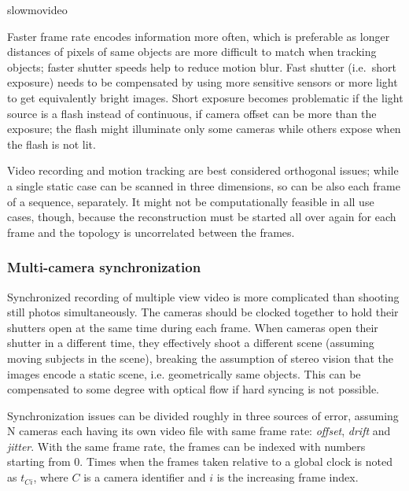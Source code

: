 slowmovideo 
\cite{eugster2011slowmovideo}

Faster frame rate encodes information more often, which is preferable as longer distances of pixels of same objects are more difficult to match when tracking objects; faster shutter speeds help to reduce motion blur.
Fast shutter (i.e.~short exposure) needs to be compensated by using more sensitive sensors or more light to get equivalently bright images.
Short exposure becomes problematic if the light source is a flash instead of continuous, if camera offset can be more than the exposure; the flash might illuminate only some cameras while others expose when the flash is not lit.

Video recording and motion tracking are best considered orthogonal issues; while a single static case can be scanned in three dimensions, so can be also each frame of a sequence, separately.
It might not be computationally feasible in all use cases, though, because the reconstruction must be started all over again for each frame and the topology is uncorrelated between the frames.




\subsubsection{Multi-camera synchronization} %


Synchronized recording of multiple view video is more complicated than shooting still photos simultaneously.
The cameras should be clocked together to hold their shutters open at the same time during each frame.
When cameras open their shutter in a different time, they effectively shoot a different scene (assuming moving subjects in the scene), breaking the assumption of stereo vision that the images encode a static scene, i.e. geometrically same objects.
This can be compensated to some degree with optical flow if hard syncing is not possible. \cite{bradley2009synchronization}

Synchronization issues can be divided roughly in three sources of error, assuming N cameras each having its own video file with same frame rate: \emph{offset}, \emph{drift} and \emph{jitter}.
With the same frame rate, the frames can be indexed with numbers starting from 0.
Times when the frames taken relative to a global clock is noted as $t_{Ci}$, where $C$ is a camera identifier and $i$ is the increasing frame index.

